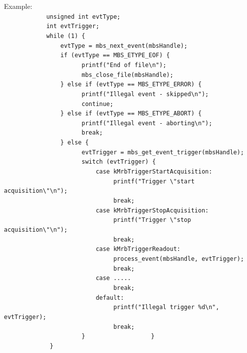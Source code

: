 \documentclass[10pt,a4paper]{article}
\newenvironment{yellowboxed}
	{\begin{Sbox}\begin{minipage}[t]}
	{\end{minipage}\end{Sbox}\colorbox{yellow}{\TheSbox}}
\begin{document}
\begin{yellowboxed}{\linewidth}
Example:\\
\verb+            unsigned int evtType;+\\
\verb+            int evtTrigger;+\\
\verb+            while (1) {+\\
\verb+                evtType = mbs_next_event(mbsHandle);+\\
\verb+                if (evtType == MBS_ETYPE_EOF) {+\\
\verb+                      printf("End of file\n");+\\
\verb+                      mbs_close_file(mbsHandle);+\\
\verb+                } else if (evtType == MBS_ETYPE_ERROR) {+\\
\verb+                      printf("Illegal event - skipped\n");+\\
\verb+                      continue;+\\
\verb+                } else if (evtType == MBS_ETYPE_ABORT) {+\\
\verb+                      printf("Illegal event - aborting\n");+\\
\verb+                      break;+\\
\verb+                } else {+\\
\verb+                      evtTrigger = mbs_get_event_trigger(mbsHandle);+\\
\verb+                      switch (evtTrigger) {+\\
\verb+                          case kMrbTriggerStartAcquisition:+\\
\verb+                               printf("Trigger \"start acquisition\"\n");+\\
\verb+                               break;+\\
\verb+                          case kMrbTriggerStopAcquisition:+\\
\verb+                               printf("Trigger \"stop acquisition\"\n");+\\
\verb+                               break;+\\
\verb+                          case kMrbTriggerReadout:+\\
\verb+                               process_event(mbsHandle, evtTrigger);+\\
\verb+                               break;+\\
\verb+                          case .....+\\
\verb+                               break;+\\
\verb+                          default:+\\
\verb+                               printf("Illegal trigger %d\n", evtTrigger);+\\
\verb+                               break;+\\
\verb+                      }+
\verb+                  }+\\
\verb+             }+
\end{yellowboxed}
\newpage
\end{document}
